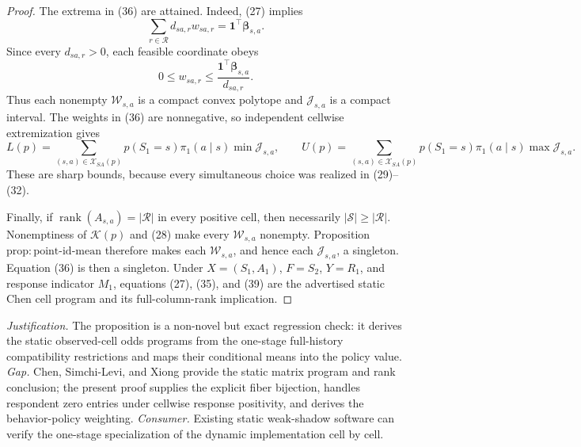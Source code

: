 \documentclass{article}
\begin{document}
\begin{proof}
The extrema in (36) are attained.  Indeed, (27) implies
\[
 \sum_{r\in\mathcal R}d_{sa,r}w_{sa,r}
 =\mathbf 1^\top\boldsymbol\beta_{s,a}.
\tag{37}
\]
Since every \(d_{sa,r}>0\), each feasible coordinate obeys
\[
 0\leq w_{sa,r}\leq
 \frac{\mathbf 1^\top\boldsymbol\beta_{s,a}}{d_{sa,r}}.
\tag{38}
\]
Thus each nonempty \(\mathcal W_{s,a}\) is a compact convex polytope and \(\mathcal J_{s,a}\) is a compact interval.  The weights in (36) are nonnegative, so independent cellwise extremization gives
\[
 L(p)=\sum_{(s,a)\in\mathcal X_{SA}(p)}p(S_1=s)\pi_1(a\mid s)\min\mathcal J_{s,a},
 \qquad
 U(p)=\sum_{(s,a)\in\mathcal X_{SA}(p)}p(S_1=s)\pi_1(a\mid s)\max\mathcal J_{s,a}.
\tag{39}
\]
These are sharp bounds, because every simultaneous choice was realized in (29)--(32).

Finally, if \(\operatorname{rank}(A_{s,a})=|\mathcal R|\) in every positive cell, then necessarily \(|\mathcal S|\geq|\mathcal R|\).  Nonemptiness of \(\mathcal K(p)\) and (28) make every \(\mathcal W_{s,a}\) nonempty.  Proposition \(\mathrm{prop{:}point\text{-}id\text{-}mean}\) therefore makes each \(\mathcal W_{s,a}\), and hence each \(\mathcal J_{s,a}\), a singleton.  Equation (36) is then a singleton.  Under \(X=(S_1,A_1)\), \(F=S_2\), \(Y=R_1\), and response indicator \(M_1\), equations (27), (35), and (39) are the advertised static Chen cell program and its full-column-rank implication.
\end{proof}
\par\smallskip\noindent \textit{Justification.} The proposition is a non-novel but exact regression check: it derives the static observed-cell odds programs from the one-stage full-history compatibility restrictions and maps their conditional means into the policy value. \textit{Gap.} Chen, Simchi-Levi, and Xiong provide the static matrix program and rank conclusion; the present proof supplies the explicit fiber bijection, handles respondent zero entries under cellwise response positivity, and derives the behavior-policy weighting. \textit{Consumer.} Existing static weak-shadow software can verify the one-stage specialization of the dynamic implementation cell by cell.
\end{document}

